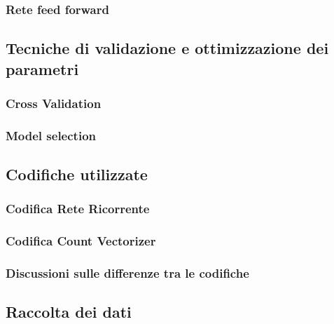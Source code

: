 \documentclass{article}
\begin{document}
\subsubsection{Rete feed forward}

\subsection{Tecniche di validazione e ottimizzazione dei parametri}
\subsubsection{Cross Validation}
\subsubsection{Model selection}

\subsection{Codifiche utilizzate}
\subsubsection{Codifica Rete Ricorrente}
\subsubsection{Codifica Count Vectorizer}
\subsubsection{Discussioni sulle differenze tra le codifiche}

\subsection{Raccolta dei dati}

\end{document}
